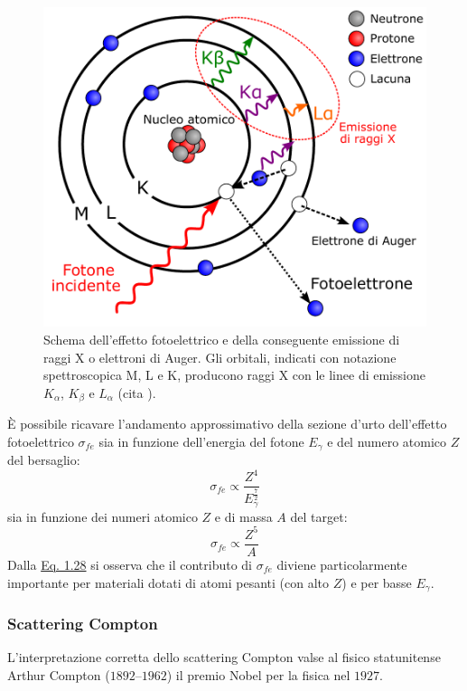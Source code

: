 \documentclass[12pt,a4paper,twoside]{report}
\begin{document}
	\begin{figure}[H]
		\centering
		\includegraphics[width=0.9\linewidth]{fotoelettrico.pdf}
		\caption{Schema dell'effetto fotoelettrico e della conseguente emissione di raggi X o elettroni di Auger. Gli orbitali, indicati con notazione spettroscopica M, L e K, producono raggi X con le linee di emissione $K_\alpha$, $K_\beta$ e $L_\alpha$ (cita
			).}
		\label{fig:fotoelettrico}
	\end{figure}
	
	\`E possibile ricavare l'andamento approssimativo della sezione d'urto dell'effetto fotoelettrico $\sigma_{fe}$ sia in funzione dell'energia del fotone $E_\gamma$ e del numero atomico $Z$ del bersaglio:
	\begin{equation}
		\sigma_{fe}\propto \frac{Z^4}{E^{\frac{7}{2}}_\gamma}
		\label{eq:sigma_fe1}
	\end{equation}
	sia in funzione dei numeri atomico $Z$ e di massa $A$ del target:
	\begin{equation}
		\sigma_{fe}\propto \frac{Z^5}{A}
		\label{eq:sigma_fe2}
	\end{equation}
	Dalla \hyperref[eq:sigma_fe1]{Eq. 1.28} si osserva che il contributo di $\sigma_{fe}$ diviene particolarmente importante per materiali dotati di atomi pesanti (con alto $Z$) e per basse $E_\gamma$.
	
	\subsubsection{Scattering Compton}
	L'interpretazione corretta dello scattering Compton valse al fisico statunitense Arthur Compton ($1892$--$1962$) il premio Nobel per la fisica nel $1927$.
	
\end{document}
